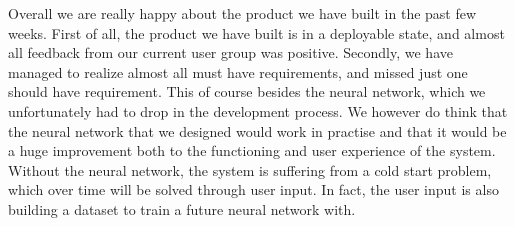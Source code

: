 Overall we are really happy about the product we have built in the past few weeks.
First of all, the product we have built is in a deployable state, and almost all feedback from our current user group was positive.
Secondly, we have managed to realize almost all must have requirements, and missed just one should have requirement. This of course besides the neural network, which we unfortunately had to drop in the development process.
We however do think that the neural network that we designed would work in practise and that it would be a huge improvement both to the functioning and user experience of the system.%
Without the neural network, the system is suffering from a cold start problem, which over time will be solved through user input. In fact, the user input is also building a dataset to train a future neural network with.

